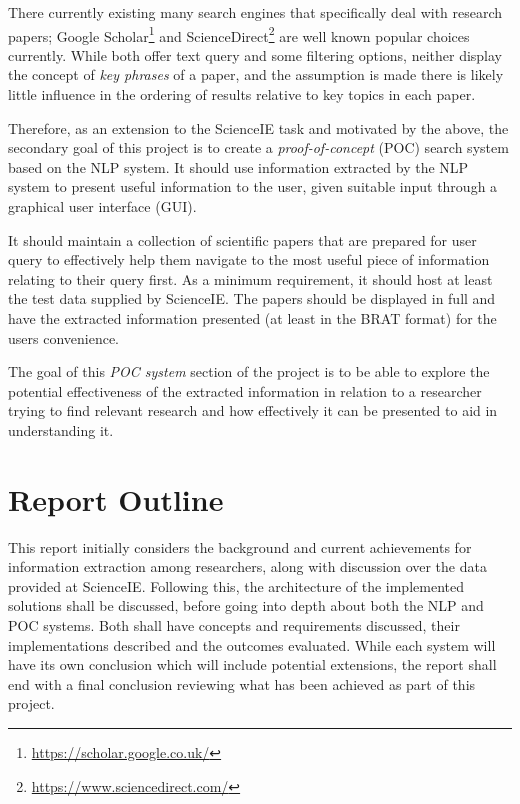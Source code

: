 There currently existing many search engines that specifically deal with research papers; Google Scholar\footnote{\href{https://scholar.google.co.uk/}{https://scholar.google.co.uk/}} and ScienceDirect\footnote{\href{https://www.sciencedirect.com/}{https://www.sciencedirect.com/}} are well known popular choices currently. While both offer text query and some filtering options, neither display the concept of \textit{key phrases} of a paper, and the assumption is made there is likely little influence in the ordering of results relative to key topics in each paper.

Therefore, as an extension to the ScienceIE task and motivated by the above, the secondary goal of this project is to create a \textit{proof-of-concept} (POC) search system based on the NLP system. It should use information extracted by the NLP system to present useful information to the user, given suitable input through a graphical user interface (GUI). 

It should maintain a collection of scientific papers that are prepared for user query to effectively help them navigate to the most useful piece of information relating to their query first. As a minimum requirement, it should host at least the test data supplied by ScienceIE. The papers should be displayed in full and have the extracted information presented (at least in the BRAT format) for the users convenience.

The goal of this \textit{POC system} section of the project is to be able to explore the potential effectiveness of the extracted information in relation to a researcher trying to find relevant research and how effectively it can be presented to aid in understanding it. 

\section{Report Outline}

This report initially considers the background and current achievements for information extraction among researchers, along with discussion over the data provided at ScienceIE. Following this, the architecture of the implemented solutions shall be discussed, before going into depth about both the NLP and POC systems. Both shall have concepts and requirements discussed, their implementations described and the outcomes evaluated. While each system will have its own conclusion which will include potential extensions, the report shall end with a final conclusion reviewing what has been achieved as part of this project.
